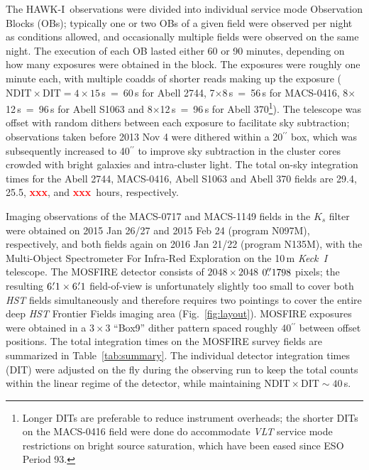 \documentclass[preprint2]{aastex6}
\newcommand\xxx{{\textcolor{red}{\bf xxx}}}
\gdef\HAWKI{\mbox{HAWK-I}}
\begin{document}
The \HAWKI\ observations were divided into individual service mode Observation Blocks (OBs); typically one or two OBs of a given field were observed per night as conditions allowed, and occasionally multiple fields were observed on the same night.  The execution of each OB lasted either 60 or 90 minutes, depending on how many exposures were obtained in the block.  The exposures were roughly one minute each, with multiple coadds of shorter reads making up the exposure ($\mathrm{NDIT}\times\mathrm{DIT} = 4\times15$\,s~=~60\,s for Abell 2744, 7$\times$8\,s~=~56\,s for MACS-0416, 8$\times$12\,s~=~96\,s for Abell S1063 and 8$\times$12\,s~=~96\,s for Abell 370\footnote{Longer DITs are preferable to reduce instrument overheads; the shorter DITs on the MACS-0416 field were done do accommodate \textit{VLT} service mode restrictions on bright source saturation, which have been eased since ESO Period 93.}).  The telescope was offset with random dithers between each exposure to facilitate sky subtraction;  observations taken before 2013 Nov 4 were dithered within a 20$^{\prime\prime}$ box, which was subsequently increased to 40$^{\prime\prime}$ to improve sky subtraction in the cluster cores crowded with bright galaxies and intra-cluster light.  The total on-sky integration times for the Abell 2744, MACS-0416, Abell S1063 and Abell 370 fields are 29.4, 25.5, \xxx, and \xxx\ hours, respectively.

Imaging observations of the MACS-0717 and MACS-1149 fields in the $K_s$ filter were obtained on 2015 Jan 26/27 and 2015 Feb 24 (program N097M), respectively, and both fields again on 2016 Jan 21/22 (program N135M), with the Multi-Object Spectrometer For Infra-Red Exploration \citep[MOSFIRE;][]{mosfire} on the 10\,m \mbox{\textit{Keck I}} telescope.  The MOSFIRE detector consists of $2048\times2048$ $0\mbox{$.\!\!^{\prime\prime}$}1798$ pixels; the resulting $6\mbox{$.\mkern-4mu^\prime$}1\times6\mbox{$.\mkern-4mu^\prime$}1$ field-of-view is unfortunately slightly too small to cover both \textit{HST} fields simultaneously and therefore requires two pointings to cover the entire deep \textit{HST} Frontier Fields imaging area (Fig.~\ref{fig:layout}).  MOSFIRE exposures were obtained in a $3\times3$ ``Box9'' dither pattern spaced roughly 40$^{\prime\prime}$ between offset positions.  The total integration times on the MOSFIRE survey fields are summarized in Table~\ref{tab:summary}.  The individual detector integration times (DIT) were adjusted on the fly during the observing run to keep the total counts within the linear regime of the detector, while maintaining $\mathrm{NDIT}\times\mathrm{DIT} \sim 40$\,s.
\end{document}
